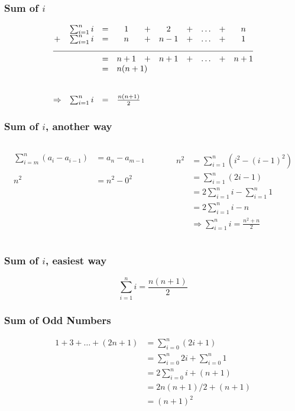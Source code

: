 \documentclass{beamer}
\newcommand{\bfr}[1]{\begin{frame}[fragile]\frametitle{{ #1 }}}
\newcommand{\cola}{\begin{columns}\begin{column}{0.5\textwidth}}
\newcommand{\colb}{\end{column}\begin{column}{0.5\textwidth}}
\newcommand{\colc}{\end{column}\end{columns}}
\begin{document}
\bfr{Sum of $i$}
\[
\begin{array}{cccccccccc}
 & \sum_{i=1}^n i &=& 1 &+& 2 &+& \ldots  &+& n
\\
+&  \sum_{i=1}^n i  &=& n &+& n-1 &+& \ldots  &+& 1
\\
\multicolumn{10}{c}{\hrulefill}
\\
 &&=& n+1 &+& n+1 &+& \ldots  &+& n+1
  \\
 & &=& \multicolumn{3}{l}{n(n+1)}
  \\\\\\
\Rightarrow&  \sum_{i=1}^n i &=& \multicolumn{3}{l}{\frac{n(n+1)}{2}}
\end{array}
\]
\end{frame}

\bfr{Sum of $i$, another way}
\cola
\begin{align*}
\sum_{i=m}^n (a_i - a_{i-1}) &= a_n - a_{m-1}\\\\\\
  n^2 &= n^2 - 0^2
\end{align*}
\colb
\begin{align*}
  n^2&= \sum_{i=1}^n (i^2 - (i-1)^2)
  \\
  &= \sum_{i=1}^n (2i - 1)
  \\
  &= 2\sum_{i=1}^n i - \sum_{i=1}^n 1
  \\
  &= 2\sum_{i=1}^n i - n
  \\
  &\Rightarrow  \sum_{i=1}^n i = \frac{n^2+n}{2}
\end{align*}
\colc
\end{frame}

\bfr{Sum of $i$, easiest way}
\[
\sum_{i=1}^n i = \frac{n(n+1)}{2}
\]
\begin{center}
\end{center}

\end{frame}

\bfr{Sum of Odd Numbers}
\begin{align*}
1 + 3 + \ldots + (2n+1) &= \sum_{i=0}^n (2i+1) 
\\
&= \sum_{i=0}^n 2i + \sum_{i=0}^n 1
\\
&= 2\sum_{i=0}^n i + (n+1)
\\
&= 2n(n+1)/2 + (n+1)
\\
&= (n+1)^2
\end{align*}
\end{frame}
\end{document}
